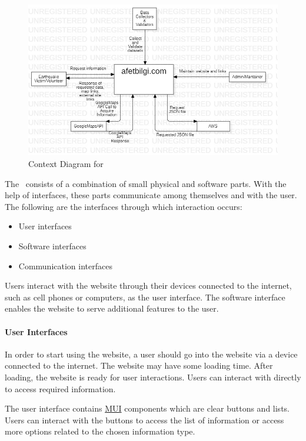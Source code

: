 \begin{figure}[H]
  \centering
  \includegraphics[width=\linewidth]{img/context-diagram.jpg}
  \caption{Context Diagram for \afetbilgi}
\end{figure}

The \afetbilgi\ consists of a combination of small physical and software parts. With the help of interfaces, these parts communicate among themselves and with the user. The following are the interfaces through which interaction occurs:
\begin{itemize}
  \item User interfaces
  \item Software interfaces
  \item Communication interfaces
\end{itemize}
Users interact with the website through their devices connected to the internet, such as cell phones or computers, as the user interface. The software interface enables the website to serve additional features to the user.

\paragraph{User Interfaces}

In order to start using the website, a user should go into the website via a device connected to the internet. The website may have some loading time. After loading, the website is ready for user interactions. Users can interact with \afetbilgi directly to access required information.

The user interface contains \href{https://mui.com/}{MUI} components which are clear buttons and lists. Users can interact with the buttons to access the list of information or access more options related to the chosen information type.

